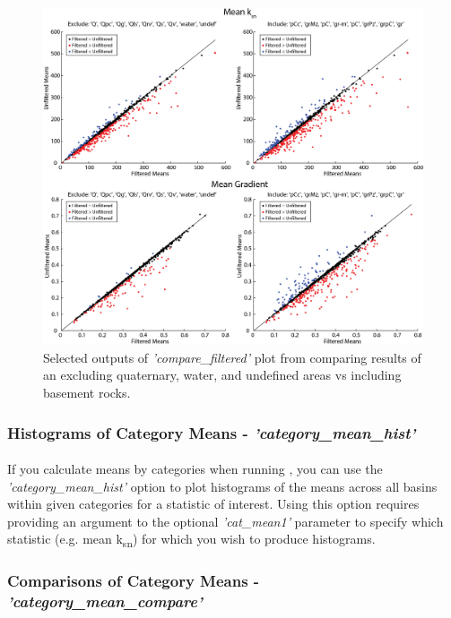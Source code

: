 \begin{figure}[H]
	\centering
	\includegraphics[width=16.5cm]{PNGs/Filtered_Basin_Comparison.png}
	\caption{Selected outputs of \textit{'compare\_filtered'} plot from  comparing results of an excluding quaternary, water, and undefined areas vs including basement rocks.}
	\label{fig:FiltBsnComp}
\end{figure}

\subsubsection{Histograms of Category Means - \textit{'category\_mean\_hist'}} \label{sec:cathist}
\paragraph{}If you calculate means by categories when running , you can use the \textit{'category\_mean\_hist'} option to plot histograms of the means across all basins within given categories for a statistic of interest. Using this option requires providing an argument to the optional \textit{'cat\_mean1'} parameter to specify which statistic (e.g. mean k\textsubscript{sn}) for which you wish to produce histograms.

\subsubsection{Comparisons of Category Means - \textit{'category\_mean\_compare'}} \label{sec:catcomp}
